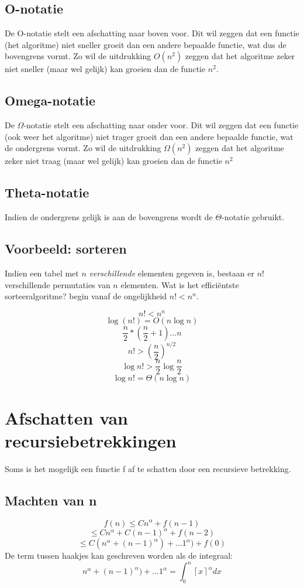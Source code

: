 \documentclass[12pt]{report}
\def\lc{\left\lceil}
\def\rc{\right\rceil}
\begin{document}
\subsection{O-notatie}
De O-notatie stelt een afschatting naar boven voor. Dit wil zeggen dat een functie (het algoritme) niet sneller groeit dan een andere bepaalde functie, wat dus de bovengrens vormt. Zo wil de uitdrukking $O(n^2)$ zeggen dat het algoritme zeker niet sneller (maar wel gelijk) kan groeien dan de functie $n^2$. 
\subsection{Omega-notatie}
De $\Omega$-notatie stelt een afschatting naar onder voor. Dit wil zeggen dat een functie (ook weer het algoritme) niet trager groeit dan een andere bepaalde functie, wat de ondergrens vormt. Zo wil de uitdrukking $\Omega(n^2)$ zeggen dat het algoritme zeker niet traag (maar wel gelijk) kan groeien dan de functie $n^2$
\subsection{Theta-notatie}
Indien de ondergrens gelijk is aan de bovengrens wordt de $\Theta$-notatie gebruikt. 
\subsection{Voorbeeld: sorteren}
Indien een tabel met $n$ \textit{verschillende} elementen gegeven is, bestaan er $n!$ verschillende permutaties van $n$ elementen. Wat is het efficiëntste sorteeralgoritme? begin vanaf de ongelijkheid $n! < n^n$.

$$ n! < n^n$$ 
$$\log(n!) = O(n\log n)$$
$$\frac{n}{2}*(\frac{n}{2}+1) ... n$$
$$n! > (\frac{n}{2})^{n/2}$$
$$\log n! > \frac{n}{2}\log\frac{n}{2}$$
$$\log n! = \Theta(n\log n)$$
\section{Afschatten van recursiebetrekkingen}
Soms is het mogelijk een functie f af te schatten door een recursieve betrekking.
\subsection{Machten van n}
$$f(n) \leq Cn^{\alpha} + f(n - 1)$$
$$\leq Cn^\alpha + C(n - 1)^\alpha + f(n - 2)$$
$$\leq C(n^\alpha + (n - 1)^\alpha) + ... 1^\alpha) + f(0)$$
De term tussen haakjes kan geschreven worden als de integraal: 
$$n^\alpha + (n - 1)^\alpha) + ... 1^\alpha = \int_{0}^{n} \lc x\rc^\alpha dx$$
\end{document}
